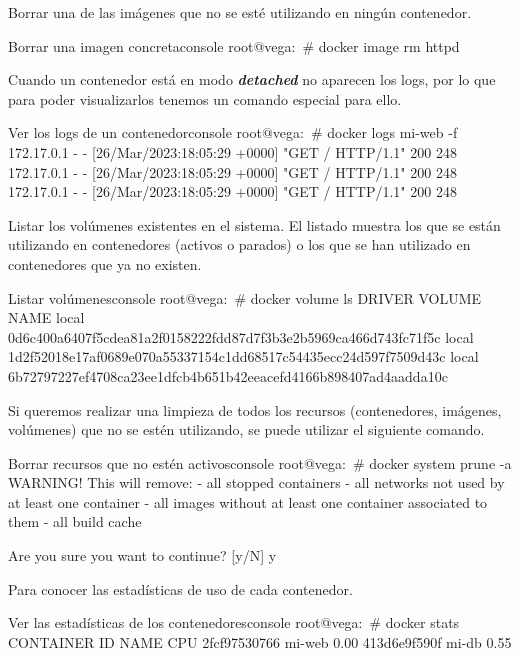 Borrar una de las imágenes que no se esté utilizando en ningún contenedor.

\begin{mycode}{Borrar una imagen concreta}{console}{}
root@vega:~# docker image rm httpd
\end{mycode}


Cuando un contenedor está en modo \textit{\textbf{detached}} no aparecen los logs, por lo que para poder visualizarlos tenemos un comando especial para ello.
\begin{mycode}{Ver los logs de un contenedor}{console}{}
root@vega:~# docker logs mi-web -f
172.17.0.1 - - [26/Mar/2023:18:05:29 +0000] "GET / HTTP/1.1" 200 248
172.17.0.1 - - [26/Mar/2023:18:05:29 +0000] "GET / HTTP/1.1" 200 248
172.17.0.1 - - [26/Mar/2023:18:05:29 +0000] "GET / HTTP/1.1" 200 248
\end{mycode}


Listar los volúmenes existentes en el sistema. El listado muestra los que se están utilizando en contenedores (activos o parados) o los que se han utilizado en contenedores que ya no existen.

\begin{mycode}{Listar volúmenes}{console}{{\small}}
root@vega:~# docker volume ls
DRIVER    VOLUME NAME
local     0d6c400a6407f5cdea81a2f0158222fdd87d7f3b3e2b5969ca466d743fc71f5c
local     1d2f52018e17af0689e070a55337154c1dd68517c54435ecc24d597f7509d43c
local     6b72797227ef4708ca23ee1dfcb4b651b42eeacefd4166b898407ad4aadda10c
\end{mycode}


Si queremos realizar una limpieza de todos los recursos (contenedores, imágenes,  volúmenes) que no se estén utilizando, se puede utilizar el siguiente comando.
\begin{mycode}{Borrar recursos que no estén activos}{console}{}
root@vega:~# docker system prune -a
WARNING! This will remove:
- all stopped containers
- all networks not used by at least one container
- all images without at least one container associated to them
- all build cache

Are you sure you want to continue? [y/N] y
\end{mycode}



Para conocer las estadísticas de uso de cada contenedor.
\begin{mycode}{Ver las estadísticas de los contenedores}{console}{{\scriptsize }}
root@vega:~# docker stats
CONTAINER ID  NAME    CPU %
2fcf97530766  mi-web  0.00%
413d6e9f590f  mi-db   0.55%
\end{mycode}



